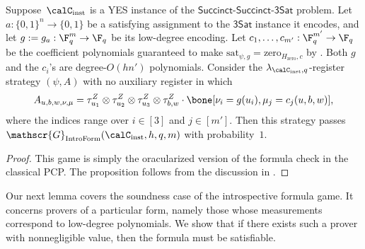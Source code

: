 \documentclass[11pt]{article}
\newcommand{\succinctsquared}{\mathsf{Succinct}\text{-}\mathsf{Succinct}\text{-}\mathsf{3Sat}}
\newcommand{\game}{\mathscr{G}}
\begin{document}
\begin{proposition}\label{prop:formula-game-completeness}
Suppose~$\calC_{\mathrm{inst}}$ is a YES instance of the $\succinctsquared$ problem.
Let $a:\{0,1\}^n \rightarrow \{0, 1\}$ be a satisfying assignment to the $\mathsf{3Sat}$ instance it encodes,
and let $g:=g_a:\F_q^m \rightarrow \F_q$ be its low-degree encoding.
Let $c_1, \ldots, c_{m'}:\F_q^{m'} \rightarrow \F_q$ be the coefficient polynomials guaranteed to make 
$\mathrm{sat}_{\psi, g} = \mathrm{zero}_{H_{\mathrm{zero}}, c}$ by .
Both $g$ and the $c_i$'s are degree-$O(hn')$ polynomials.
Consider the $\lambda_{\calC_{\mathrm{inst}},q}$-register strategy $(\psi, A)$ with no auxiliary register in which
\begin{equation*}
A_{u, b, w, \nu, \mu} =  \tau^Z_{u_1} \otimes \tau^Z_{u_2} \otimes \tau^Z_{u_3} \otimes \tau^Z_{b, w}  \cdot \bone[\nu_i = g(u_i), \mu_j = c_j(u, b, w)],
\end{equation*}
where the indices range over $i \in [3]$ and $j \in [m']$.
Then this strategy passes $\game_{\mathrm{IntroForm}}(\calC_{\mathrm{inst}}, h, q, m)$ with probability~$1$.
\end{proposition}
\begin{proof}
This game is simply the oracularized version of the formula check in the classical PCP.
The proposition follows from the discussion in .
\end{proof}

Our next lemma covers the soundness case of the introspective formula game.
It concerns provers of a particular form,
namely those whose measurements correspond to low-degree polynomials.
We show that if there exists such a prover with nonnegligible value, then the formula must be satisfiable.
\end{document}
